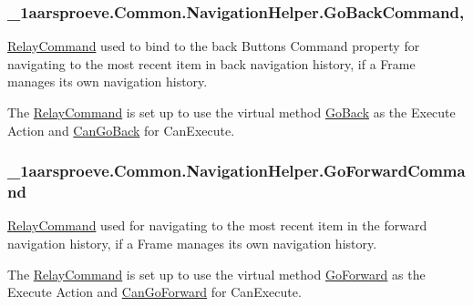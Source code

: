 \subsubsection[{Go\+Back\+Command}]{ \+\_\+1aarsproeve.\+Common.\+Navigation\+Helper.\+Go\+Back\+Command\hspace{0.3cm}{\ttfamily [get]}, {\ttfamily [set]}}\label{class__1aarsproeve_1_1_common_1_1_navigation_helper_a4f5f9df95a5c10434b08d04da50a2467}


\hyperlink{class__1aarsproeve_1_1_common_1_1_relay_command}{Relay\+Command} used to bind to the back Button\textquotesingle{}s Command property for navigating to the most recent item in back navigation history, if a Frame manages its own navigation history. 

The \hyperlink{class__1aarsproeve_1_1_common_1_1_relay_command}{Relay\+Command} is set up to use the virtual method \hyperlink{class__1aarsproeve_1_1_common_1_1_navigation_helper_ac31589f6f0725544c6d6f8c409816a9c}{Go\+Back} as the Execute Action and \hyperlink{class__1aarsproeve_1_1_common_1_1_navigation_helper_a6022d2d426e7213d412325d1b9fc05ed}{Can\+Go\+Back} for Can\+Execute. \hypertarget{class__1aarsproeve_1_1_common_1_1_navigation_helper_a9bb68ebbefcf2daaeaf8f18775eb8a80}{}
\subsubsection[{Go\+Forward\+Command}]{ \+\_\+1aarsproeve.\+Common.\+Navigation\+Helper.\+Go\+Forward\+Command\hspace{0.3cm}{\ttfamily [get]}}\label{class__1aarsproeve_1_1_common_1_1_navigation_helper_a9bb68ebbefcf2daaeaf8f18775eb8a80}


\hyperlink{class__1aarsproeve_1_1_common_1_1_relay_command}{Relay\+Command} used for navigating to the most recent item in the forward navigation history, if a Frame manages its own navigation history. 

The \hyperlink{class__1aarsproeve_1_1_common_1_1_relay_command}{Relay\+Command} is set up to use the virtual method \hyperlink{class__1aarsproeve_1_1_common_1_1_navigation_helper_a56206b1bac5776daee0f5c79e26d4845}{Go\+Forward} as the Execute Action and \hyperlink{class__1aarsproeve_1_1_common_1_1_navigation_helper_aaa3cbdb865a20d782eff8cd283bb8e0b}{Can\+Go\+Forward} for Can\+Execute. 

